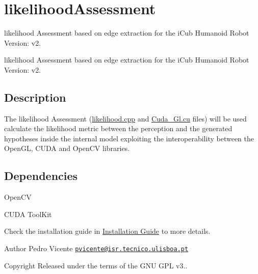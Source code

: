 \section{likelihood\+Assessment}
\label{group__likelihoodAssessment}


likelihood Assessment based on edge extraction for the i\+Cub Humanoid Robot Version\+: v2.  


likelihood Assessment based on edge extraction for the i\+Cub Humanoid Robot Version\+: v2. 

\hypertarget{group__internalModel_Description}{}\subsection{Description}\label{group__internalModel_Description}
The likelihood Assessment (\hyperlink{likelihood_8cpp}{likelihood.\+cpp} and \hyperlink{Cuda__Gl_8cu_source}{Cuda\+\_\+\+Gl.\+cu} files) will be used calculate the likelihood metric between the perception and the generated hypotheses inside the internal model exploiting the interoperability between the Open\+GL, C\+U\+DA and Open\+CV libraries.\hypertarget{group__likelihoodAssessment_dependencies_sec}{}\subsection{Dependencies}\label{group__likelihoodAssessment_dependencies_sec}
Open\+CV

C\+U\+DA Tool\+Kit

Check the installation guide in \hyperlink{installation}{Installation Guide} to more details.

\begin{DoxyAuthor}{Author}
Pedro Vicente \href{mailto:pvicente@isr.tecnico.ulisboa.pt}{\tt pvicente@isr.\+tecnico.\+ulisboa.\+pt} ~\newline

\end{DoxyAuthor}
\begin{DoxyCopyright}{Copyright}
Released under the terms of the G\+NU G\+PL v3.. 
\end{DoxyCopyright}
